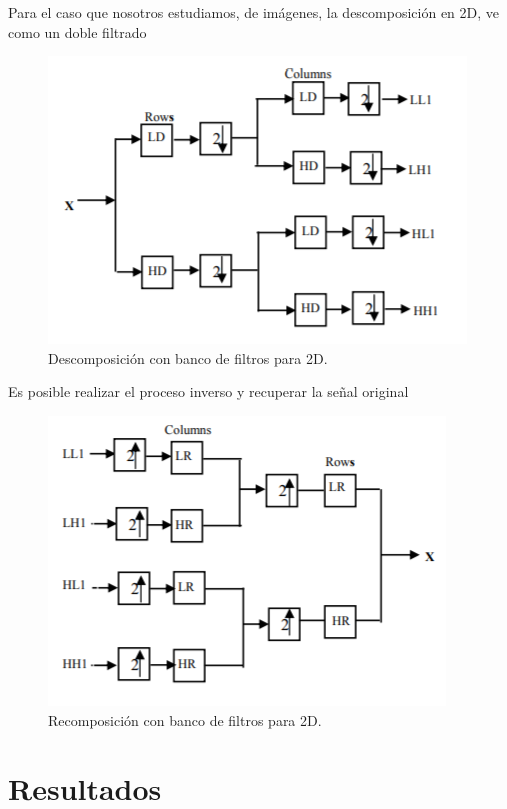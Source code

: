 \documentclass{beamer}
\begin{document}
\begin{frame}
Para el caso que nosotros estudiamos, de imágenes, la descomposición en 2D, ve como un doble filtrado
\begin{figure}[H]
	\centering
	\includegraphics[width=.75\textwidth]{imgs/bancofiltros}
	\caption{Descomposición con banco de filtros para 2D.}
	\label{bancofiltros}
\end{figure}
\end{frame}
\begin{frame}
Es posible realizar el proceso inverso y recuperar la señal original
\begin{figure}[H]
	\centering
	\includegraphics[width=.75\textwidth]{imgs/bancofiltrosR}
	\caption{Recomposición con banco de filtros para 2D.}
	\label{bancofiltrosR}
\end{figure}
\end{frame}






  \section{Resultados}
\end{document}
